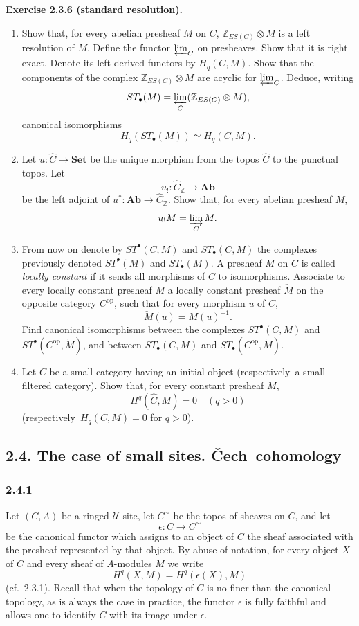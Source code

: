 \documentclass[11pt]{article}
\newcommand{\U}{\mathcal{U}}
\newcommand{\Set}{\mathbf{Set}}
\newcommand{\Ab}{\mathbf{Ab}}
\newcommand{\ZZ}{\mathbb Z}
\newcommand{\Cech}{\v{C}ech}
\newcommand{\resp}{respectively}
\newcommand{\cf}{cf.}
\newcommand{\op}{\mathrm{op}}
\newenvironment{remarktext}[1]{\par\medskip\noindent\textbf{#1.}\ }{\par\medskip}
\begin{document}
\begin{remarktext}{Exercise 2.3.6 (standard resolution)}
\begin{enumerate}[label=\alph*)]
\item Show that, for every abelian presheaf $M$ on $C$, $\ZZ_{ES(C)}\otimes M$ is a left resolution of $M$. Define the functor $\varprojlim_C$ on presheaves. Show that it is right exact. Denote its left derived functors by $H_q(C,M)$. Show that the components of the complex $\ZZ_{ES(C)}\otimes M$ are acyclic for $\varprojlim_C$. Deduce, writing
\[
ST_\bullet(M)=\varprojlim_C(\ZZ_{ES(C)}\otimes M),
\]
canonical isomorphisms
\[
H_q(ST_\bullet(M))\simeq H_q(C,M).
\]

\item Let $u:\widehat C\to\Set$ be the unique morphism from the topos $\widehat C$ to the punctual topos. Let
\[
u_!:\widehat C_{\ZZ}\longrightarrow \Ab
\]
be the left adjoint of $u^*:\Ab\to\widehat C_{\ZZ}$. Show that, for every abelian presheaf $M$,
\[
u_!M=\varinjlim_C M.
\]

\item From now on denote by $ST^\bullet(C,M)$ and $ST_\bullet(C,M)$ the complexes previously denoted $ST^\bullet(M)$ and $ST_\bullet(M)$. A presheaf $M$ on $C$ is called \emph{locally constant} if it sends all morphisms of $C$ to isomorphisms. Associate to every locally constant presheaf $M$ a locally constant presheaf $\check M$ on the opposite category $C^\op$, such that for every morphism $u$ of $C$,
\[
\check M(u)=M(u)^{-1}.
\]
Find canonical isomorphisms between the complexes $ST^\bullet(C,M)$ and $ST^\bullet(C^\op,\check M)$, and between $ST_\bullet(C,M)$ and $ST_\bullet(C^\op,\check M)$.

\item Let $C$ be a small category having an initial object (\resp\ a small filtered category). Show that, for every constant presheaf $M$,
\[
H^q(\widehat C,M)=0\quad(q>0)
\]
(\resp\ $H_q(C,M)=0$ for $q>0$).
\end{enumerate}
\end{remarktext}

\subsection*{2.4. The case of small sites. \Cech\ cohomology}

\subsubsection*{2.4.1}
Let $(C,A)$ be a ringed $\U$-site, let $C^\sim$ be the topos of sheaves on $C$, and let
\[
\epsilon:C\longrightarrow C^\sim
\]
be the canonical functor which assigns to an object of $C$ the sheaf associated with the presheaf represented by that object. By abuse of notation, for every object $X$ of $C$ and every sheaf of $A$-modules $M$ we write
\[
H^q(X,M)=H^q(\epsilon(X),M)
\]
(\cf\ 2.3.1). Recall that when the topology of $C$ is no finer than the canonical topology, as is always the case in practice, the functor $\epsilon$ is fully faithful and allows one to identify $C$ with its image under $\epsilon$.
\end{document}

